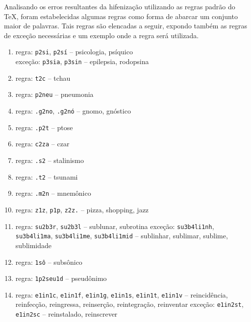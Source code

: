 \documentclass{article}
\begin{document}
Analisando os erros resultantes da hifenização utilizando as regras padrão do
TeX, foram estabelecidas algumas regras como forma de abarcar um conjunto maior
de palavras. Tais regras são elencadas a seguir, expondo também as regras de
exceção necessárias e um exemplo onde a regra será utilizada.

\begin{enumerate}
\item\label{rulegrp_psi} regra: \texttt{p2si}, \texttt{p2sí} -- psicologia, psíquico\\
exceção: \texttt{p3sia}, \texttt{p3sin} -- epilepsia, rodopsina

\item\label{rulegrp_tc} regra: \texttt{t2c} -- tchau%

\item\label{rulegrp_pneu} regra: \texttt{p2neu} -- pneumonia
    
\item\label{rulegrp_gno} regra: \texttt{.g2no}, \texttt{.g2nó} -- gnomo, gnóstico

\item\label{rulegrp_pt} regra: \texttt{.p2t} -- ptose%

\item\label{rulegrp_cza} regra: \texttt{c2za} -- czar

\item\label{rulegrp_s2} regra: \texttt{.s2} -- stalinismo

\item\label{rulegrp_t2} regra: \texttt{.t2} -- tsunami

\item\label{rulegrp_mn} regra: \texttt{.m2n} -- mnemônico

\item\label{rulegrp_zz} regra: \texttt{z1z}, \texttt{p1p}, \texttt{z2z.} -- pizza, shopping, jazz

\item\label{rulegrp_sub} regra: \texttt{su2b3r}, \texttt{su2b3l} -- sublunar, subrotina
exceção: \texttt{su3b4li1nh}, \texttt{su3b4li1ma}, \texttt{su3b4li1me}, \texttt{su3b4li1mid} -- sublinhar, sublimar, sublime, sublimidade

\item\label{rulegrp_so} regra: \texttt{1sô} -- subsônico

\item\label{rulegrp_pseu} regra: \texttt{1p2seu1d} -- pseudônimo

\item\label{rulegrp_ein} regra: \texttt{e1in1c}, \texttt{e1in1f}, \texttt{e1in1g}, \texttt{e1in1s}, \texttt{e1in1t}, \texttt{e1in1v} -- reincidência, reinfecção, reingressa, reinserção, reintegração, reinventar
exceção: \texttt{e1in2st}, \texttt{e1in2sc} -- reinstalado, reinscrever 


\end{enumerate}
\end{document}
